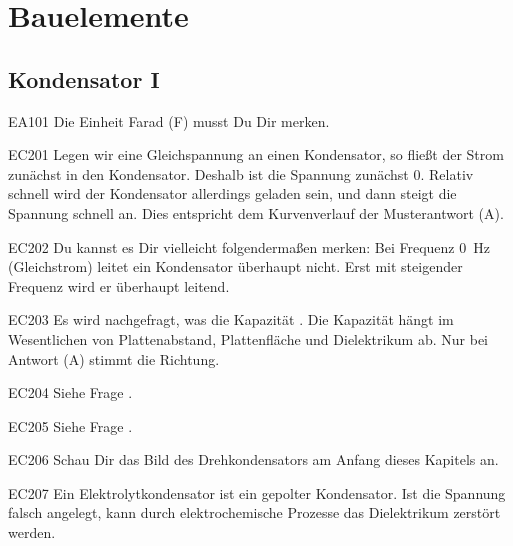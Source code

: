 \setcounter{section}{4}
\section{Bauelemente}
\subsection{Kondensator I}

\begin{sol}{EA101}
  Die Einheit Farad (F) musst Du Dir merken.
\end{sol}

\begin{sol}{EC201}
  Legen wir eine Gleichspannung an einen Kondensator, so fließt der Strom zunächst in den Kondensator. Deshalb ist die Spannung zunächst 0. Relativ schnell wird der Kondensator allerdings geladen sein, und dann steigt die Spannung schnell an. Dies entspricht dem Kurvenverlauf der Musterantwort (A).
\end{sol}


\begin{sol}{EC202}
  Du kannst es Dir vielleicht folgendermaßen merken:
  Bei Frequenz \SI{0}{\hertz} (Gleichstrom) leitet ein Kondensator überhaupt nicht. Erst mit steigender Frequenz wird er überhaupt leitend.
\end{sol}


\begin{sol}{EC203}
 Es wird nachgefragt, was die Kapazität . Die Kapazität hängt im Wesentlichen von Plattenabstand, Plattenfläche und Dielektrikum ab. Nur bei Antwort (A) stimmt die Richtung.
\end{sol}


\begin{sol}{EC204}
  Siehe Frage .
\end{sol}

\begin{sol}{EC205}
  Siehe Frage .
\end{sol}

\begin{sol}{EC206}
  Schau Dir das Bild des Drehkondensators am Anfang dieses Kapitels an.
\end{sol}

\begin{sol}{EC207}
 Ein Elektrolytkondensator ist ein gepolter Kondensator. Ist die Spannung falsch angelegt, kann durch elektrochemische Prozesse das Dielektrikum zerstört werden.
\end{sol}


